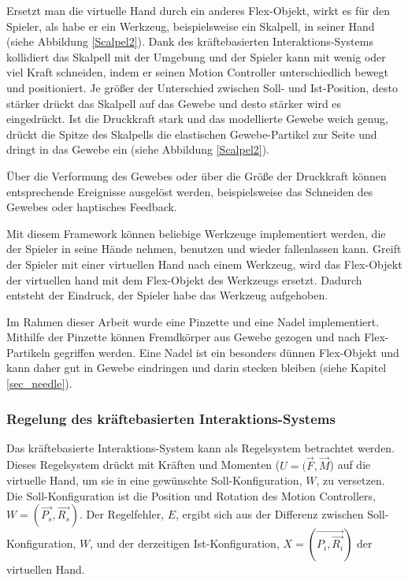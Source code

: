 Ersetzt man die virtuelle Hand durch ein anderes Flex-Objekt, wirkt es für den Spieler, als habe er ein Werkzeug, beispielsweise ein Skalpell, in seiner Hand (siehe Abbildung \ref{Scalpel2}). 
Dank des kräftebasierten Interaktions-Systems kollidiert das Skalpell mit der Umgebung und der Spieler kann mit wenig oder viel Kraft schneiden, indem er seinen Motion Controller unterschiedlich bewegt und positioniert. Je größer der Unterschied zwischen Soll- und Ist-Position, desto stärker drückt das Skalpell auf das Gewebe und desto stärker wird es eingedrückt. Ist die Druckkraft stark und das modellierte Gewebe weich genug, drückt die Spitze des Skalpells die elastischen Gewebe-Partikel zur Seite und dringt in das Gewebe ein (siehe Abbildung \ref{Scalpel2}).


Über die Verformung des Gewebes oder über die Größe der Druckkraft können entsprechende Ereignisse ausgelöst werden, beispielsweise das Schneiden des Gewebes oder haptisches Feedback.

Mit diesem Framework können beliebige Werkzeuge implementiert werden, die der Spieler in seine Hände nehmen, benutzen und wieder fallenlassen kann. Greift der Spieler mit einer virtuellen Hand nach einem Werkzeug, wird das Flex-Objekt der virtuellen hand mit dem Flex-Objekt des Werkzeugs ersetzt. Dadurch entsteht der Eindruck, der Spieler habe das Werkzeug aufgehoben.

Im Rahmen dieser Arbeit wurde eine Pinzette und eine Nadel implementiert. Mithilfe der Pinzette können Fremdkörper aus Gewebe gezogen und nach Flex-Partikeln gegriffen werden. Eine Nadel ist ein besonders dünnen Flex-Objekt und kann daher gut in Gewebe eindringen und darin stecken bleiben (siehe Kapitel \ref{sec_needle}).

\subsubsection{Regelung des kräftebasierten Interaktions-Systems}
Das kräftebasierte Interaktions-System kann als Regelsystem betrachtet werden. Dieses Regelsystem drückt mit Kräften und Momenten ($U = (\vec{F} , \vec{M}$) auf die virtuelle Hand, um sie in eine gewünschte Soll-Konfiguration, $W$, zu versetzen. Die Soll-Konfiguration ist die Position und Rotation des Motion Controllers, $W = (\vec{P_s} , \vec{R_s})$. Der Regelfehler, $E$, ergibt sich aus der Differenz zwischen Soll-Konfiguration, $W$, und der derzeitigen Ist-Konfiguration, $X = (\vec{P_i , \vec{R_i}})$ der virtuellen Hand.

